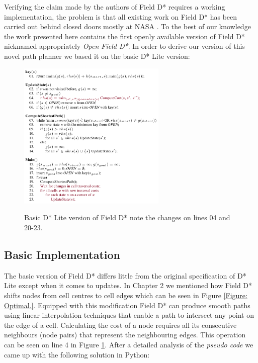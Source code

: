 \noindent
Verifying the claim made by the authors of Field D* requires a working implementation, the problem is that all existing work on Field D* has been carried out behind closed doors mostly at NASA \cite{FIELD, FIELD2}. To the best of our knowledge the work presented here contains the first openly available version of Field D* nicknamed appropriately \textit{Open Field D*}. In order to derive our version of this novel path planner we based it on the basic D* Lite version:

\begin{figure}[htbp]

\center \includegraphics[width=200pt]{illustrations/field_d_basic}\\
\caption{Basic D* Lite version of Field D* note the changes on lines 04 and 20-23.} 
\label{field_d_basic}

\end{figure}

\subsection{Basic Implementation}

\noindent
The basic version of Field D* differs little from the original specification of D* Lite except when it comes to updates. In Chapter 2 we mentioned how Field D* shifts nodes from cell centres to cell edges which can be seen in Figure \ref{Figure: Optimal.}. Equipped with this modification Field D* can produce smooth paths using linear interpolation techniques that enable a path to intersect any point on the edge of a cell. Calculating the cost of a node requires all its consecutive neighbours (node pairs) that represent the neighbouring edges. This operation can be seen on line 4 in Figure \ref{field_d_basic}. After a detailed analysis of the \textit{pseudo code} we came up with the following solution in Python: \\

